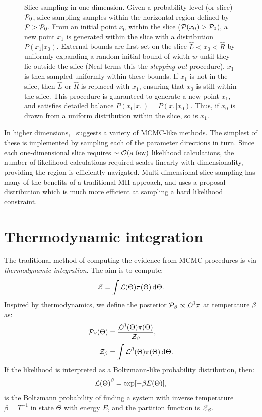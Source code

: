 \begin{figure}[tp]
  \caption{Slice sampling in one dimension. 
    Given a probability level (or slice) $\mathcal{P}_0$, slice sampling samples within the horizontal region defined by $\mathcal{P}>\mathcal{P}_0$. 
    From an initial point $x_0$ within the slice ($\mathcal{P}(x_0)>\mathcal{P}_0$), a new point $x_1$ is generated within the slice with a distribution $P(x_1|x_0)$.
    External bounds are first set on the slice $\hat{L}<x_0<\hat{R}$ by uniformly expanding a random initial bound of width $w$ until they lie outside the slice (Neal terms this the {\em stepping out\/} procedure). 
    $x_1$ is then sampled uniformly within these bounds.  
    If $x_1$ is not in the slice, then $\hat{L}$ or $\hat{R}$ is replaced with $x_1$, ensuring that $x_0$ is still within the slice.
    This procedure is guaranteed to generate a new point $x_1$, and satisfies detailed balance $P(x_0|x_1) = P(x_1|x_0)$. Thus, if $x_0$ is drawn from a uniform distribution within the slice, so is $x_1$.\label{fig:bay:1d_slice}
  }
\end{figure}



In higher dimensions,~\cite{NealSlice} suggests a variety of MCMC-like methods. The simplest of these is implemented by sampling each of the parameter directions in turn. Since each one-dimensional slice requires ${\sim\mathcal{O}{\left(\text{a few}\right)}}$ likelihood calculations, the number of likelihood calculations required scales linearly with dimensionality, providing the region is efficiently navigated. Multi-dimensional slice sampling has many of the benefits of a traditional MH approach, and uses a proposal distribution which is much more efficient at sampling a hard likelihood constraint.

\section{Thermodynamic integration}
The traditional method of computing the evidence from MCMC procedures is via {\em thermodynamic integration}.
The aim is to compute:
\begin{equation}
  \mathcal{Z} = \int \mathcal{L}(\Theta) \pi(\Theta) \operatorname{d}^{}\!{\Theta}.
\end{equation}
Inspired by thermodynamics, we define the posterior $\mathcal{P}_\beta \propto \mathcal{L}^\beta\pi$ at temperature $\beta$ as:
\begin{align}
  \mathcal{P}_\beta(\Theta) &= \frac{\mathcal{L}^{\beta}(\Theta) \pi(\Theta)}{\mathcal{Z}_\beta}, 
  \label{eqn:bay:posteriorb}
  \\
  \mathcal{Z}_\beta &= \int\mathcal{L}^{\beta}(\Theta) \pi(\Theta) \operatorname{d}^{}\!{\Theta}.
  \label{eqn:bay:evb}
\end{align}
If the likelihood is interpreted as a Boltzmann-like probability distribution, then:
\begin{equation}
{\mathcal{L}(\Theta)}^\beta = \exp[-\beta E(\Theta)],
\end{equation}
is the Boltzmann probability of finding a system with inverse temperature $\beta = T^{-1}$ in state $\Theta$ with energy $E$, and the partition function is $\mathcal{Z}_\beta$.

